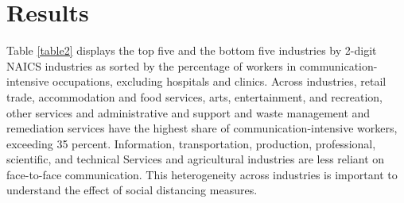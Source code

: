 \section*{Results}
Table \ref{table2} displays the top five and the bottom five industries by 2-digit NAICS industries as sorted by the percentage of workers in communication-intensive occupations, excluding hospitals and clinics. Across industries, retail trade, accommodation and food services, arts, entertainment, and recreation, other services and administrative and support and waste management and remediation services have the highest share of communication-intensive workers, exceeding 35 percent. Information, transportation, production, professional, scientific, and technical Services and agricultural industries are less reliant on face-to-face communication. This heterogeneity across industries is important to understand the effect of social distancing measures.

